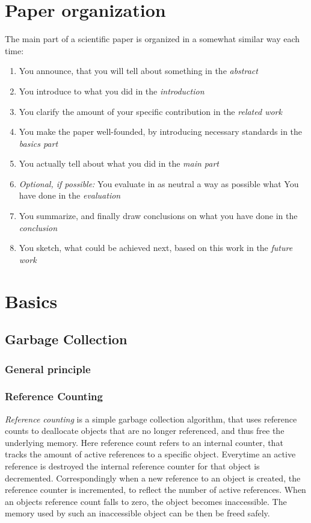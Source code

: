 \documentclass[twocolumn]{article}
\begin{document}

\section{Paper organization}
The main part of a scientific paper is organized in a somewhat similar way
each time:
\begin{enumerate}
\item You announce, that you will tell about something in the \emph{abstract}
\item You introduce to what you did in the \emph{introduction}
\item You clarify the amount of your specific contribution in the \emph{related work}
\item You make the paper well-founded, by introducing necessary standards in the \emph{basics part}
\item You actually tell about what you did in the \emph{main part}
\item \emph{Optional, if possible:} You evaluate in as neutral a way as possible what You have done in the \emph{evaluation}
\item You summarize, and finally draw conclusions on what you have done in the \emph{conclusion}
\item You sketch, what could be achieved next, based on this work in the \emph{future work}
\end{enumerate}

\section{Basics}
\subsection{Garbage Collection}
\subsubsection{General principle}
\subsubsection{Reference Counting}
\textit{Reference counting} is a simple garbage collection algorithm, that uses reference counts to deallocate objects that are no longer referenced, and thus free the underlying memory.
Here reference count refers to an internal counter, that tracks the amount of active references to a specific object.
Everytime an active reference is destroyed the internal reference counter for that object is decremented.
Correspondingly when a new reference to an object is created, the reference counter is incremented, to reflect the number of active references.
When an objects reference count falls to zero, the object becomes inaccessible.
The memory used by such an inaccessible object can be then be freed safely.
\end{document}
